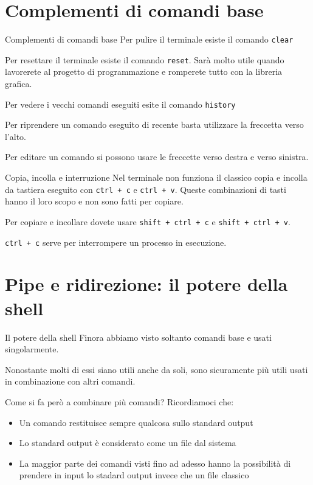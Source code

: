 \documentclass{beamer}
\begin{document}
\section{Complementi di comandi base}

\begin{frame}{Complementi di comandi base}
  Per pulire il terminale esiste il comando \texttt{clear}\bigskip

  Per resettare il terminale esiste il comando \texttt{reset}. Sarà molto utile
  quando lavorerete al progetto di programmazione e romperete tutto con 
  la libreria grafica.\bigskip

  Per vedere i vecchi comandi eseguiti esite il comando \texttt{history}\bigskip

  Per riprendere un comando eseguito di recente basta utilizzare la freccetta
  verso l'alto.\bigskip

  Per editare un comando si possono usare le freccette verso destra e verso 
  sinistra.\bigskip
\end{frame}

\begin{frame}{Copia, incolla e interruzione}
  Nel terminale non funziona il classico copia e incolla da tastiera eseguito
  con \texttt{ctrl + c} e \texttt{ctrl + v}. Queste combinazioni di tasti hanno 
  il loro scopo e non sono fatti per copiare.\bigskip

  Per copiare e incollare dovete usare \texttt{shift + ctrl + c} e 
  \texttt{shift + ctrl + v}.\bigskip

  \texttt{ctrl + c} serve per interrompere un processo in esecuzione.
\end{frame}

\section{Pipe e ridirezione: il potere della shell}
\begin{frame}{Il potere della shell}
  Finora abbiamo visto soltanto comandi base e usati singolarmente.\bigskip

  Nonostante molti di essi siano utili anche da soli, sono sicuramente più 
  utili usati in combinazione con altri comandi.\bigskip

  Come si fa però a combinare più comandi? \pause
  Ricordiamoci che:
  \begin{itemize}
    \item <2-> Un comando restituisce sempre qualcosa sullo standard output
    \item <3-> Lo standard output è considerato come un file dal sistema
    \item <4-> La maggior parte dei comandi visti fino ad adesso hanno la 
      possibilità di prendere in input lo stadard output invece che un file 
      classico
  \end{itemize}
\end{frame}
\end{document}
